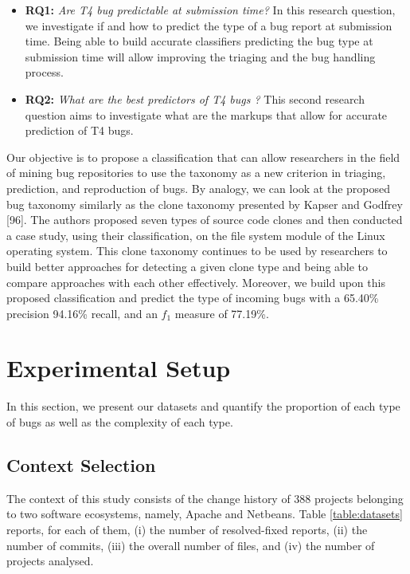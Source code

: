 \documentclass[12pt]{report}
\providecommand{\tightlist}{%
  \setlength{\itemsep}{0pt}\setlength{\parskip}{0pt}}
\begin{document}
\begin{itemize}
\tightlist
\item
  \textbf{RQ1:} \emph{Are T4 bug predictable at submission time?} In
  this research question, we investigate if and how to predict the type
  of a bug report at submission time. Being able to build accurate
  classifiers predicting the bug type at submission time will allow
  improving the triaging and the bug handling process.
\item
  \textbf{RQ2:} \emph{What are the best predictors of T4 bugs ?} This
  second research question aims to investigate what are the markups that
  allow for accurate prediction of T4 bugs.
\end{itemize}

Our objective is to propose a classification that can allow researchers
in the field of mining bug repositories to use the taxonomy as a new
criterion in triaging, prediction, and reproduction of bugs. By analogy,
we can look at the proposed bug taxonomy similarly as the clone taxonomy
presented by Kapser and Godfrey {[}96{]}. The authors proposed seven
types of source code clones and then conducted a case study, using their
classification, on the file system module of the Linux operating system.
This clone taxonomy continues to be used by researchers to build better
approaches for detecting a given clone type and being able to compare
approaches with each other effectively. Moreover, we build upon this
proposed classification and predict the type of incoming bugs with a
65.40\% precision 94.16\% recall, and an \(f_1\) measure of 77.19\%.

\section{Experimental Setup}\label{experimental-setup-4}

In this section, we present our datasets and quantify the proportion of
each type of bugs as well as the complexity of each type.

\subsection{\texorpdfstring{Context
Selection\label{sec:context-selection}}{Context Selection}}\label{context-selection}

The context of this study consists of the change history of 388 projects
belonging to two software ecosystems, namely, Apache and Netbeans. Table
\ref{table:datasets} reports, for each of them, (i) the number of
resolved-fixed reports, (ii) the number of commits, (iii) the overall
number of files, and (iv) the number of projects analysed.
\end{document}
